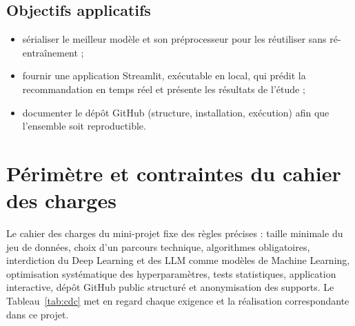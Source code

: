 \documentclass[11pt,a4paper]{report}
\numberwithin{equation}{chapter}
\begin{document}
\subsection{Objectifs applicatifs}
\begin{itemize}
\item sérialiser le meilleur modèle et son préprocesseur pour les réutiliser sans ré-entraînement ;
\item fournir une application Streamlit, exécutable en local, qui prédit la recommandation en temps réel et présente les résultats de l'étude ;
\item documenter le dépôt GitHub (structure, installation, exécution) afin que l'ensemble soit reproductible.
\end{itemize}

\section{Périmètre et contraintes du cahier des charges}
Le cahier des charges du mini-projet fixe des règles précises : taille minimale du jeu de données, choix d'un parcours technique, algorithmes obligatoires, interdiction du Deep Learning et des LLM comme modèles de Machine Learning, optimisation systématique des hyperparamètres, tests statistiques, application interactive, dépôt GitHub public structuré et anonymisation des supports. Le Tableau~\ref{tab:cdc} met en regard chaque exigence et la réalisation correspondante dans ce projet.
\end{document}
